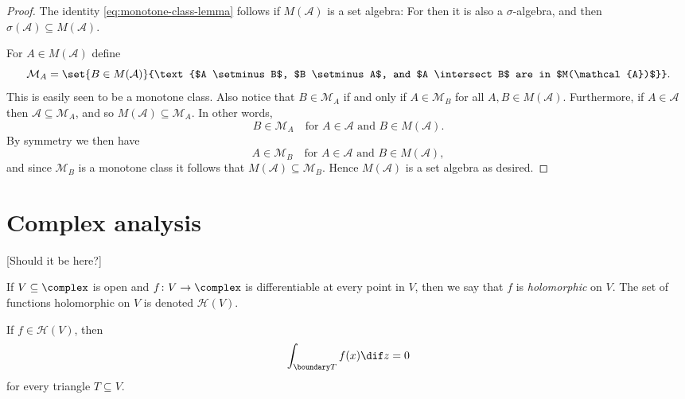 \documentclass[article, a4paper, 11pt, oneside]{memoir}
\numberwithin{equation}{chapter}
\newcommand{\calM}{\mathcal{M}}
\newcommand{\calA}{\mathcal{A}}
\begin{document}
\begin{proof}
    The identity \cref{eq:monotone-class-lemma} follows if $M(\calA)$ is a set algebra: For then it is also a $\sigma$-algebra, and then $\sigma(\calA) \subseteq M(\calA)$.

    For $A \in M(\calA)$ define
    \begin{equation*}
        \calM_A
            = \set{B \in M(\calA)}{\text{$A \setminus B$, $B \setminus A$, and $A \intersect B$ are in $M(\calA)$}}.
    \end{equation*}
    This is easily seen to be a monotone class. Also notice that $B \in \calM_A$ if and only if $A \in \calM_B$ for all $A,B \in M(\calA)$. Furthermore, if $A \in \calA$ then $\calA \subseteq \calM_A$, and so $M(\calA) \subseteq \calM_A$. In other words,
    \begin{equation*}
        B \in \calM_A
        \quad
        \text{for $A \in \calA$ and $B \in M(\calA)$}.
    \end{equation*}
    By symmetry we then have
    \begin{equation*}
        A \in \calM_B
        \quad
        \text{for $A \in \calA$ and $B \in M(\calA)$},
    \end{equation*}
    and since $\calM_B$ is a monotone class it follows that $M(\calA) \subseteq \calM_B$. Hence $M(\calA)$ is a set algebra as desired.
\end{proof}


\chapter{Complex analysis}

[Should it be here?]

\newcommand{\diam}{\operatorname{diam}}
\newcommand{\hol}{\mathcal{H}}

If $V \subseteq \complex$ is open and $f \colon V \to \complex$ is differentiable at every point in $V$, then we say that $f$ is \emph{holomorphic} on $V$. The set of functions holomorphic on $V$ is denoted $\hol(V)$.

\begin{theorem}
    If $f \in \hol(V)$, then
    \begin{equation*}
        \int_{\boundary T} f(x) \dif z = 0
    \end{equation*}
    for every triangle $T \subseteq V$.
\end{theorem}
\end{document}
